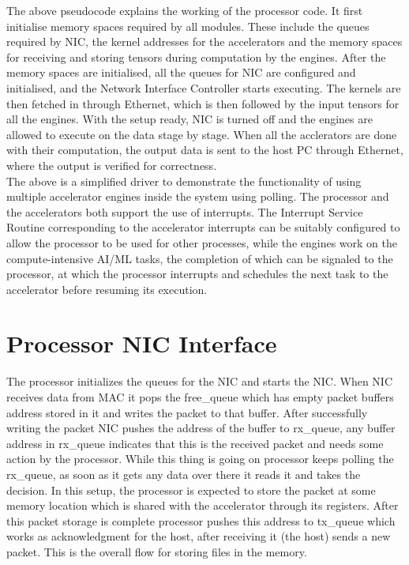 \documentclass[12pt]{report}
\begin{document}
The above pseudocode explains the working of the processor code. It first initialise memory spaces required by all modules. These include the queues required by NIC, the kernel addresses for the accelerators and the memory spaces for receiving and storing tensors during computation by the engines. After the memory spaces are initialised, all the queues for NIC are configured and initialised, and the Network Interface Controller starts executing. The kernels are then fetched in through Ethernet, which is then followed by the input tensors for all the engines. With the setup ready, NIC is turned off and the engines are allowed to execute on the data stage by stage. When all the acclerators are done with their computation, the output data is sent to the host PC through Ethernet, where the output is verified for correctness.
\\

The above is a simplified driver to demonstrate the functionality of using multiple accelerator engines inside the system using polling. The processor and the accelerators both support the use of interrupts. The Interrupt Service Routine corresponding to the accelerator interrupts can be suitably configured to allow the processor to be used for other processes, while the engines work on the compute-intensive AI/ML tasks, the completion of which can be signaled to the processor, at which the processor interrupts and schedules the next task to the accelerator before resuming its execution.
\\


\section{Processor NIC Interface}

The processor initializes the queues for the NIC and starts the NIC. When NIC receives data from MAC it pops the free\_queue which has empty packet buffers address stored in it and writes the packet to that buffer. After successfully writing the packet NIC pushes the address of the buffer to rx\_queue, any buffer address in rx\_queue indicates that this is the received packet and needs some action by the processor. While this thing is going on processor keeps polling the rx\_queue, as soon as it gets any data over there it reads it and takes the decision. In this setup, the processor is expected to store the packet at some memory location which is shared with the accelerator through its registers. After this packet storage is complete processor pushes this address to tx\_queue which works as acknowledgment for the host, after receiving it (the host) sends a new packet. This is the overall flow for storing files in the memory.
\\
\end{document}
